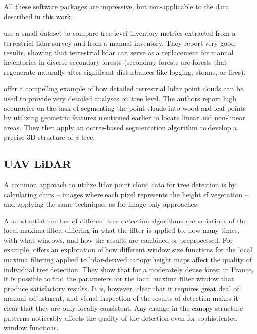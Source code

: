 All these software packages are impressive, but non-applicable to the data described in this work.

\citet{vianaTimberVolumeEstimation2022} use a small dataset to compare tree-level inventory metrics extracted from a terrestrial \gls{lidar} survey and from a manual inventory.
They report very good results, showing that terrestrial \gls{lidar} can serve as a replacement for manual inventories in diverse secondary forests (secondary forests are forests that regenerate naturally after significant disturbances like logging, storms, or fires).

\citet{nurunnabiDevelopmentPreciseTree2024} offer a compelling example of how detailed terrestrial \gls{lidar} point clouds can be used to provide very detailed analyses on tree level.
The authors report high accuracies on the task of segmenting the point clouds into wood and leaf points by utilizing geometric features mentioned earlier to locate linear and non-linear areas.
They then apply an octree-based segmentation algorithm to develop a precise 3D structure of a tree.

\subsection{UAV LiDAR}

A common approach to utilize \gls{lidar} point cloud data for tree detection is by calculating \glspl{chm} – images where each pixel represents the height of vegetation – and applying the same techniques as for image-only approaches.

A substantial number of different tree detection algorithms are variations of the local maxima filter, differing in what the filter is applied to, how many times, with what windows, and how the results are combined or preprocessed.
For example, \citet{doussExtractionIndividualTrees2022} offers an exploration of how different window size functions for the local maxima filtering applied to \gls{lidar}-derived canopy height maps affect the quality of individual tree detection.
They show that for a moderately dense forest in France, it is possible to find the parameters for the local maxima filter window that produce satisfactory results.
It is, however, clear that it requires great deal of manual adjustment, and visual inspection of the results of detection makes it clear that they are only locally consistent.
Any change in the canopy structure patterns noticeably affects the quality of the detection even for sophisticated window functions.

